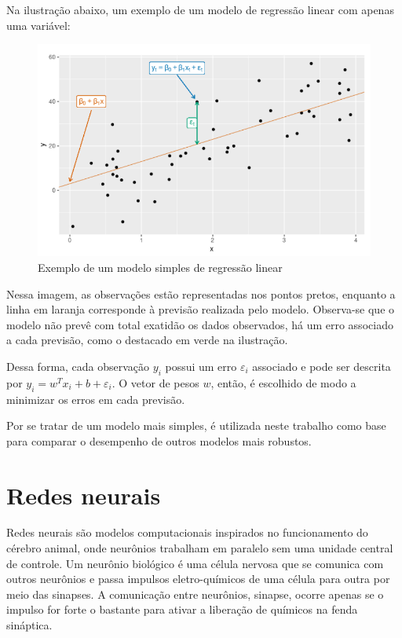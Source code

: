 Na ilustração abaixo, um exemplo de um modelo de regressão 
linear com apenas uma variável:

\begin{figure}[H] 
  \includegraphics[width= 12cm]{../figuras/reg_lin.png}
  \caption{Exemplo de um modelo simples de regressão linear
  \cite{forecasting}}
  \label{fig:reg_lin}
\end{figure}

Nessa imagem, as observações estão 
representadas nos pontos pretos, enquanto a linha em laranja
corresponde à previsão realizada pelo modelo. Observa-se que
o modelo não prevê com total exatidão os dados observados, há 
um erro associado a cada previsão, como o destacado em verde 
na ilustração.

Dessa forma, cada observação $y_i$ possui um erro ${\varepsilon}_i$ 
associado e pode ser descrita por $y_i = w^T x_i + b + {\varepsilon}_i$.
O vetor de pesos $w$, então, é escolhido de modo a minimizar 
os erros em cada previsão.

Por se tratar de um modelo mais simples, é utilizada neste trabalho como base 
para comparar o desempenho de outros modelos mais robustos.

\section{Redes neurais}

Redes neurais são modelos computacionais inspirados no funcionamento
do cérebro animal, onde neurônios trabalham em paralelo sem 
uma unidade central de controle. Um neurônio biológico é uma célula 
nervosa que se comunica com outros neurônios e passa impulsos 
eletro-químicos de uma célula para outra por meio das sinapses.
A comunicação entre neurônios, sinapse, ocorre apenas se o impulso 
for forte o bastante para ativar a liberação de
químicos na fenda sináptica.

